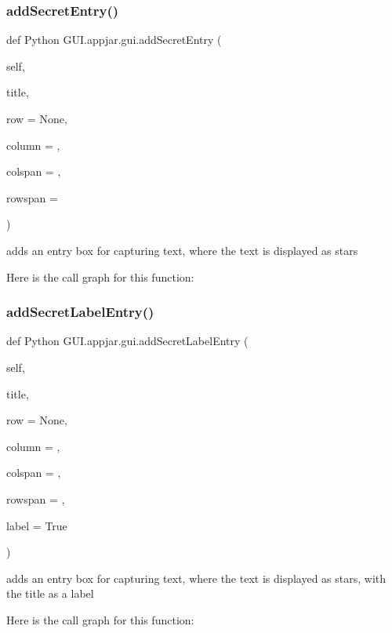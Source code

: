 \subsubsection{\texorpdfstring{add\+Secret\+Entry()}{addSecretEntry()}}
{\footnotesize\ttfamily def Python G\+U\+I.\+appjar.\+gui.\+add\+Secret\+Entry (\begin{DoxyParamCaption}\item[{}]{self,  }\item[{}]{title,  }\item[{}]{row = {\ttfamily None},  }\item[{}]{column = {},  }\item[{}]{colspan = {},  }\item[{}]{rowspan = {} }\end{DoxyParamCaption})}

\begin{DoxyVerb}adds an entry box for capturing text, where the text is displayed as stars \end{DoxyVerb}
 Here is the call graph for this function\+:
\mbox{\label{class_python_01_g_u_i_1_1appjar_1_1gui_a1447e36595511819a7fa27294523f463}} 
\subsubsection{\texorpdfstring{add\+Secret\+Label\+Entry()}{addSecretLabelEntry()}}
{\footnotesize\ttfamily def Python G\+U\+I.\+appjar.\+gui.\+add\+Secret\+Label\+Entry (\begin{DoxyParamCaption}\item[{}]{self,  }\item[{}]{title,  }\item[{}]{row = {\ttfamily None},  }\item[{}]{column = {},  }\item[{}]{colspan = {},  }\item[{}]{rowspan = {},  }\item[{}]{label = {\ttfamily True} }\end{DoxyParamCaption})}

\begin{DoxyVerb}adds an entry box for capturing text, where the text is displayed as stars, with the title as a label \end{DoxyVerb}
 Here is the call graph for this function\+:
\mbox{\label{class_python_01_g_u_i_1_1appjar_1_1gui_a2f80b5878fe70e4ce66f4259eb36c8c1}} 
